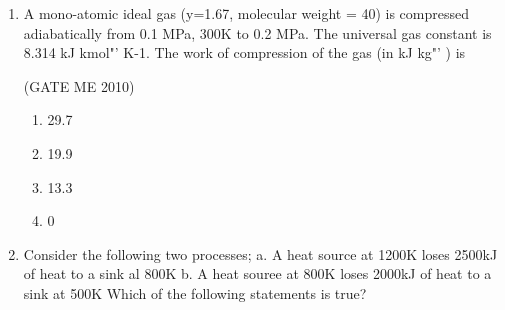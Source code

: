 \documentclass[journal,12pt,onecolumn]{IEEEtran}
\theoremstyle{remark}
\begin{document}
\begin{enumerate}
 $
\begin{array}{|l|l|}
\hline
\text{P: Compressible flow} & \text{U: Reynolds number} \\ \hline
\text{Q: Free surface flow} & \text{V: Nusselt number} \\ \hline
\text{R: Boundary layer flow} & \text{W: Weber number} \\ \hline
\text{S: Pipe flow} & \text{X: Froude number} \\ \hline
\text{T: Heat convection} & \text{Y: Mach number} \\ \hline
& \text{Z: Skin friction coefficient} \\ \hline
\end{array}
$


\hfill{(GATE  ME 2010)}\\




\begin{multicols}{2}
\begin{enumerate}
\item P-U; Q-X; R-V; S-Z; T-W
\item P-W; Q-X; R-Z: S-U; T-V
\item P-Y: Q-W: R-Z: S-U: T-X
\item P-Y; Q-W; R-Z: S-U; T-V
\end{enumerate}
\end{multicols}

\item A mono-atomic ideal gas (y=1.67, molecular weight = 40) is compressed adiabatically from 0.1 MPa, 300K to 0.2 MPa. The universal gas constant is 8.314 kJ kmol"' K-1. The work of compression of the gas (in kJ kg"' ) is


\hfill{(GATE  ME 2010)}\\


\begin{multicols}{4}
\begin{enumerate}
\item 29.7
\item 19.9
\item 13.3
\item 0
\end{enumerate}
\end{multicols}


\item Consider the following two processes;
a. A heat source at 1200K loses 2500kJ of heat to a sink al 800K
b. A heat souree at 800K loses 2000kJ of heat to a sink at 500K
Which of the following statements is true?


\end{enumerate}
\end{document}
